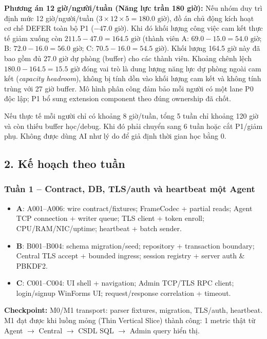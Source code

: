 \textbf{Phương án 12 giờ/người/tuần (Năng lực trần 180 giờ):} Nếu nhóm duy trì định mức 12 giờ/người/tuần ($3 \times 12 \times 5 = 180.0\text{ giờ}$), đồ án chủ động kích hoạt cơ chế DEFER toàn bộ P1 ($-47.0\text{ giờ}$). Khi đó khối lượng công việc cam kết thực tế giảm xuống còn $211.5 - 47.0 = 164.5\text{ giờ}$ (thành viên A: $69.0 - 15.0 = 54.0\text{ giờ}$; B: $72.0 - 16.0 = 56.0\text{ giờ}$; C: $70.5 - 16.0 = 54.5\text{ giờ}$). Khối lượng 164.5 giờ này đã bao gồm đủ $27.0\text{ giờ}$ dự phòng (buffer) cho các thành viên. Khoảng chênh lệch $180.0 - 164.5 = 15.5\text{ giờ}$ đóng vai trò là dung lượng năng lực dự phòng ngoài cam kết (\textit{capacity headroom}), không bị tính dồn vào khối lượng cam kết và không tính trùng với 27 giờ buffer. Mô hình phân công đảm bảo mỗi người có một lane P0 độc lập; P1 bổ sung extension component theo đúng ownership đã chốt.

\begin{warningbox}
Nếu thực tế mỗi người chỉ có khoảng 8 giờ/tuần, tổng 5 tuần chỉ khoảng 120 giờ và còn thiếu buffer học/debug. Khi đó phải chuyển sang 6 tuần hoặc cắt P1/giảm phụ. Không được dùng AI như lý do để giả định thời gian học bằng 0.
\end{warningbox}

\subsection*{2. Kế hoạch theo tuần}

\subsubsection*{Tuần 1 -- Contract, DB, TLS/auth và heartbeat một Agent}

\begin{itemize}
    \item \textbf{A}: A001--A006: wire contract/fixtures; FrameCodec + partial reads; Agent TCP connection + writer queue; TLS client + token enroll; CPU/RAM/NIC/uptime; heartbeat + batch sender.
    \item \textbf{B}: B001--B004: schema migration/seed; repository + transaction boundary; Central TLS accept + bounded ingress; session registry + server auth \& PBKDF2.
    \item \textbf{C}: C001--C004: UI shell + navigation; Admin TCP/TLS RPC client; login/signup WinForms UI; request/response correlation + timeout.
\end{itemize}

\textbf{Checkpoint:} M0/M1 transport: parser fixtures, migration, TLS/auth, heartbeat. M1 đạt được khi luồng mỏng (Thin Vertical Slice) thành công: 1 metric thật từ Agent $\rightarrow$ Central $\rightarrow$ CSDL SQL $\rightarrow$ Admin query hiển thị.

